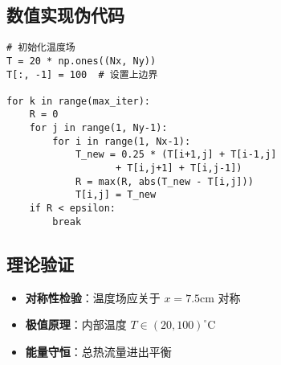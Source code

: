 \documentclass[UTF8]{ctexart}
\begin{document}
\subsection{数值实现伪代码}
\begin{verbatim}
# 初始化温度场
T = 20 * np.ones((Nx, Ny))
T[:, -1] = 100  # 设置上边界

for k in range(max_iter):
    R = 0
    for j in range(1, Ny-1):
        for i in range(1, Nx-1):
            T_new = 0.25 * (T[i+1,j] + T[i-1,j] 
                   + T[i,j+1] + T[i,j-1])
            R = max(R, abs(T_new - T[i,j]))
            T[i,j] = T_new
    if R < epsilon:
        break
\end{verbatim}

\subsection{理论验证}
\begin{itemize}
    \item \textbf{对称性检验}：温度场应关于 $ x=7.5\text{cm} $ 对称
    \item \textbf{极值原理}：内部温度 $ T \in (20,100)^\circ \text{C} $ \\
    \item \textbf{能量守恒}：总热流量进出平衡
\end{itemize}
\end{document}
